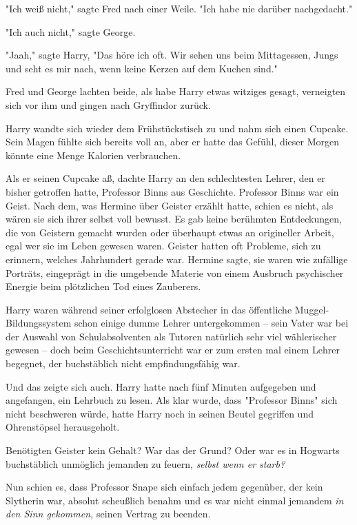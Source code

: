 {"Ich weiß nicht," sagte Fred nach einer Weile. "Ich habe nie darüber nachgedacht."

"Ich auch nicht," sagte George.

"Jaah," sagte Harry, "Das höre ich oft. Wir sehen uns beim Mittagessen, Jungs und seht es mir nach, wenn keine Kerzen auf dem Kuchen sind."

Fred und George lachten beide, als habe Harry etwas witziges gesagt, verneigten sich vor ihm und gingen nach Gryffindor zurück.

Harry wandte sich wieder dem Frühstückstisch zu und nahm sich einen Cupcake. Sein Magen fühlte sich bereits voll an, aber er hatte das Gefühl, dieser Morgen könnte eine Menge Kalorien verbrauchen.

Als er seinen Cupcake aß, dachte Harry an den schlechtesten Lehrer, den er bisher getroffen hatte, Professor Binns aus Geschichte. Professor Binns war ein Geist. Nach dem, was Hermine über Geister erzählt hatte, schien es nicht, als wären sie sich ihrer selbst voll bewusst. Es gab keine berühmten Entdeckungen, die von Geistern gemacht wurden oder überhaupt etwas an origineller Arbeit, egal wer sie im Leben gewesen waren. Geister hatten oft Probleme, sich zu erinnern, welches Jahrhundert gerade war. Hermine sagte, sie waren wie zufällige Porträts, eingeprägt in die umgebende Materie von einem Ausbruch psychischer Energie beim plötzlichen Tod eines Zauberers.

Harry waren während seiner erfolglosen Abstecher in das öffentliche Muggel-Bildungssystem schon einige dumme Lehrer untergekommen -- sein Vater war bei der Auswahl von Schulabsolventen als Tutoren natürlich sehr viel wählerischer gewesen -- doch beim Geschichtsunterricht war er zum ersten mal einem Lehrer begegnet, der buchstäblich nicht empfindungsfähig war.

Und das zeigte sich auch. Harry hatte nach fünf Minuten aufgegeben und angefangen, ein Lehrbuch zu lesen. Als klar wurde, dass "Professor Binns" sich nicht beschweren würde, hatte Harry noch in seinen Beutel gegriffen und Ohrenstöpsel herausgeholt.

Benötigten Geister kein Gehalt? War das der Grund? Oder war es in Hogwarts buchstäblich unmöglich jemanden zu feuern, \emph{selbst wenn er starb?}

Nun schien es, dass Professor Snape sich einfach jedem gegenüber, der kein Slytherin war, absolut scheußlich benahm und es war nicht einmal jemandem \emph{in den Sinn gekommen,} seinen Vertrag zu beenden.

}
